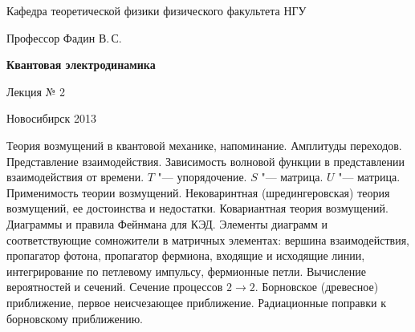 \documentclass[12pt,pagesize,paper=192mm:108mm]{scrbook}
\begin{document}
\begin{titlepage}
\begin{center}
    Кафедра теоретической физики физического факультета НГУ
    \medskip

    \Large
    Профессор Фадин В.\,С.
    \bigskip

    \huge
    \textbf{Квантовая электродинамика}
    \bigskip

    \Large
    Лекция № 2
    \vfill

    \normalsize
    \vfill


    \normalsize \ccbysa\hspace{0.5em}  Новосибирск 2013
  \end{center}
\end{titlepage}
\newpage

\vspace*{-1em}
\begin{center}
\vfill
  \begin{minipage}{0.65\linewidth}
    Теория возмущений в квантовой механике, напоминание. Амплитуды
    переходов.  Представление взаимодействия. Зависимость волновой
    функции в представлении взаимодействия от времени. $T$ "---
    упорядочение. $S$ "--- матрица. $U$ "--- матрица.  Применимость теории
    возмущений. Нековаринтная (шредингеровская) теория возмущений, ее
    достоинства и недостатки. Ковариантная теория
    возмущений. Диаграммы и правила Фейнмана для КЭД. Элементы
    диаграмм и соответствующие сомножители в матричных элементах:
    вершина взаимодействия, пропагатор фотона, пропагатор фермиона,
    входящие и исходящие линии, интегрирование по петлевому импульсу,
    фермионные петли. Вычисление вероятностей и сечений. Сечение
    процессов $2 \to 2$. Борновское (древесное) приближение, первое
    неисчезающее приближение. Радиационные поправки к борновскому
    приближению.
  \end{minipage}
  \vfill

\end{center}
\end{document}
